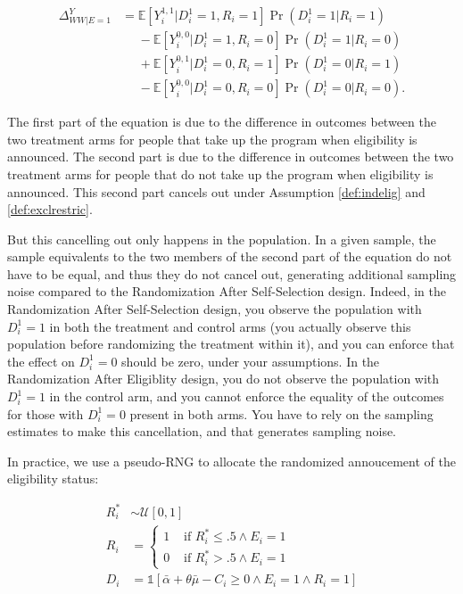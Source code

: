 \documentclass[]{book}
\newcommand{\uns}[1]{\mathds{1}[ #1 ]}
\newcommand{\esp}[1]{\mathbb{E}[ #1 ]}
\theoremstyle{definition}
\theoremstyle{definition}
\theoremstyle{definition}
\theoremstyle{remark}
\let\BeginKnitrBlock\begin \let\EndKnitrBlock\end
\begin{document}
\begin{align*}
  \Delta^Y_{WW|E=1} & = \esp{Y_i^{1,1}|D_i^1=1,R_i=1}\Pr(D^1_i=1|R_i=1)\\
                    & \phantom{=}-\esp{Y_i^{0,0}|D_i^1=1,R_i=0}\Pr(D^1_i=1|R_i=0) \\
                    & \phantom{=}+ \esp{Y_i^{0,1}|D_i^1=0,R_i=1}\Pr(D^1_i=0|R_i=1)\\
                    & \phantom{=}-\esp{Y_i^{0,0}|D_i^1=0,R_i=0}\Pr(D^1_i=0|R_i=0).  
\end{align*}

The first part of the equation is due to the difference in outcomes
between the two treatment arms for people that take up the program when
eligibility is announced. The second part is due to the difference in
outcomes between the two treatment arms for people that do not take up
the program when eligibility is announced. This second part cancels out
under Assumption \ref{def:indelig} and \ref{def:exclrestric}.

But this cancelling out only happens in the population. In a given
sample, the sample equivalents to the two members of the second part of
the equation do not have to be equal, and thus they do not cancel out,
generating additional sampling noise compared to the Randomization After
Self-Selection design. Indeed, in the Randomization After Self-Selection
design, you observe the population with \(D_i^1=1\) in both the
treatment and control arms (you actually observe this population before
randomizing the treatment within it), and you can enforce that the
effect on \(D_i^1=0\) should be zero, under your assumptions. In the
Randomization After Eligiblity design, you do not observe the population
with \(D_i^1=1\) in the control arm, and you cannot enforce the equality
of the outcomes for those with \(D_i^1=0\) present in both arms. You
have to rely on the sampling estimates to make this cancellation, and
that generates sampling noise.

\BeginKnitrBlock{remark}
\iffalse{} {Remark. } \fi{}In practice, we use a pseudo-RNG to allocate
the randomized annoucement of the eligibility status:
\EndKnitrBlock{remark}

\begin{align*}
  R_i^* & \sim \mathcal{U}[0,1]\\
  R_i & = 
  \begin{cases}
    1 & \text{ if } R_i^*\leq .5 \land E_i=1\\
    0 & \text{ if } R_i^*> .5 \land E_i=1
  \end{cases} \\
  D_i & = \uns{\bar{\alpha}+\theta\bar{\mu}-C_i\geq0 \land E_i=1 \land R_i=1}
\end{align*}
\end{document}
